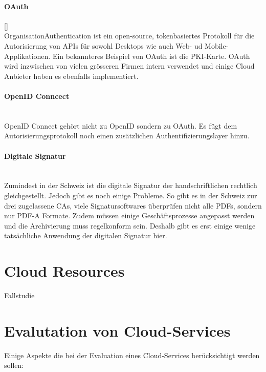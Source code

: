 \documentclass[a4paper, 11pt]{article}
\begin{document}
\paragraph{OAuth}\mbox[]\\
OrganisationAuthentication ist ein open-source, tokenbasiertes Protokoll für die Autorisierung von APIs für sowohl Desktops wie auch Web- ud Mobile-Applikationen. Ein bekannteres Beispiel von OAuth ist die PKI-Karte. OAuth wird inzwischen von vielen grösseren Firmen intern verwendet und einige Cloud Anbieter haben es ebenfalls implementiert.

\paragraph{OpenID Conncect}\mbox{}\\
OpenID Connect gehört nicht zu OpenID sondern zu OAuth. Es fügt dem Autorisierungsprotokoll noch einen zusätzlichen Authentifizierungslayer hinzu. 

\paragraph{Digitale Signatur}\mbox{}\\
Zumindest in der Schweiz ist die digitale Signatur der handschriftlichen rechtlich gleichgestellt. Jedoch gibt es noch einige Probleme. So gibt es in der Schweiz zur drei zugelassene CAs, viele Signatursoftwares überprüfen nicht alle PDFs, sondern nur PDF-A Formate. Zudem müssen einige Geschäftsprozesse angepasst werden und die Archivierung muss regelkonform sein. Deshalb gibt es erst einige wenige tatsächliche Anwendung der digitalen Signatur hier.


\section{Cloud Resources}

Fallstudie

\newpage

\section{Evalutation von Cloud-Services}

Einige Aspekte die bei der Evaluation eines Cloud-Services berücksichtigt werden sollen:
\end{document}
